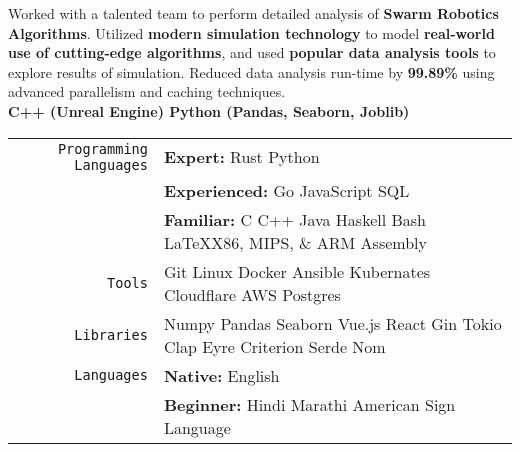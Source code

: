 \documentclass[
    10pt,
    A4,
    english,
    draft = false,
    twoside = false,
]{article}
\begin{document}
	{Worked with a talented team to perform detailed analysis of \textbf{Swarm Robotics Algorithms}. Utilized \textbf{modern simulation technology} to model \textbf{real-world use of cutting-edge algorithms}, and used \textbf{popular data analysis tools} to explore results of simulation. Reduced data analysis run-time by \textbf{99.89\%} using advanced parallelism and caching techniques. \\ \textbf{C++ (Unreal Engine) \cvContactSpace Python (Pandas, Seaborn, Joblib)}}
	\tab \begin{tabular}{r p{}}
		\texttt{\large Programming Languages} & \textbf{Expert:} Rust \cvContactSep Python \\ & \textbf{Experienced:} Go \cvContactSep JavaScript \cvContactSep SQL \\ & \textbf{Familiar:} C \cvContactSep C++ \cvContactSep Java \cvContactSep Haskell \cvContactSep Bash \cvContactSep \LaTeX \cvContactSep X86, MIPS, \& ARM Assembly\\
		\texttt{\large Tools} & Git \cvContactSep Linux \cvContactSep Docker \cvContactSep Ansible \cvContactSep Kubernates \cvContactSep Cloudflare \cvContactSep AWS \cvContactSep Postgres \\
		\texttt{\large Libraries} & Numpy \cvContactSep Pandas \cvContactSep Seaborn \cvContactSpace Vue.js \cvContactSep React \cvContactSpace Gin \cvContactSpace Tokio \cvContactSep Clap \cvContactSep Eyre \cvContactSep Criterion \cvContactSep Serde \cvContactSep Nom\\
		\texttt{\large Languages} & \textbf{Native:} English \\ & \textbf{Beginner:} Hindi \cvContactSep Marathi \cvContactSep American Sign Language \\
	\end{tabular}\\~\\
	
	\newpage
	
\end{document}
